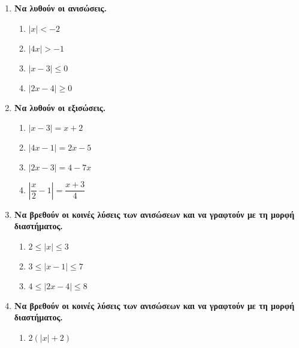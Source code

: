 \documentclass[twoside,nofonts,internet]{askhseis}
\begin{document}
\begin{enumerate}[label=\bf\textcolor{black}{{\large \arabic*.}},
itemsep=5mm]
\begin{multicols}{4}
\begin{enumerate}[label=\roman*.]
\item $ \left|x\right|<4 $
\item $ \left|x\right|>5 $
\item $ \left|x-1\right|<2 $
\item $ \left|x+2\right|>3 $
\item $ \left|2x-1\right|\leq5 $
\item $ \left|3x+4\right|\geq8 $
\item $ \left|1-x\right|<2 $
\item $ \left|3-4x\right|\geq5 $
\end{enumerate}
\end{multicols}
\item \textbf{Να λυθούν οι ανισώσεις.}
\begin{multicols}{4}
\begin{enumerate}[label=\roman*.]
\item $ \left|x\right|<-2 $
\item $ \left|4x\right|>-1 $
\item $ \left|x-3\right|\leq0 $
\item $ \left|2x-4\right|\geq0 $
\end{enumerate}
\end{multicols}
\item \textbf{Να λυθούν οι εξισώσεις.}
\begin{multicols}{4}
\begin{enumerate}[label=\roman*.]
\item $ \left|x-3\right|=x+2 $
\item $ \left|4x-1\right|=2x-5 $
\item $ \left|2x-3\right|=4-7x $
\item $ \left|\dfrac{x}{2}-1\right|=\dfrac{x+3}{4} $
\end{enumerate}
\end{multicols}
\item \textbf{Να βρεθούν οι κοινές λύσεις των ανισώσεων και να γραφτούν με τη μορφή διαστήματος.}
\begin{multicols}{3}
\begin{enumerate}[label=\roman*.]
\item $ 2\leq\left|x\right|\leq3 $
\item $ 3\leq\left|x-1\right|\leq7 $
\item $4\leq\left|2x-4\right|\leq8 $
\end{enumerate}
\end{multicols}
\item \textbf{Να βρεθούν οι κοινές λύσεις των ανισώσεων και να γραφτούν με τη μορφή διαστήματος.}
\begin{multicols}{3}
\begin{enumerate}[label=\roman*.]
\item $ 2\left( \left|x\right|+2\right) $
\end{enumerate}
\end{multicols}
\end{enumerate}
\end{document}
